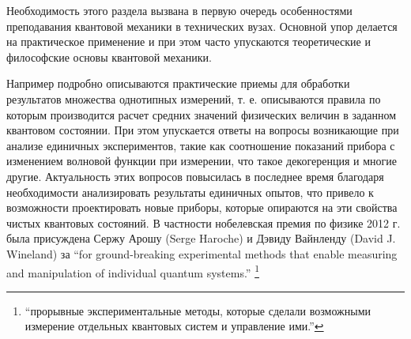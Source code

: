 Необходимость этого раздела вызвана в первую очередь особенностями
преподавания квантовой механики в технических вузах. Основной упор
делается на практическое применение и при этом часто упускаются
теоретические и философские основы квантовой механики.

Например подробно описываются практические приемы для обработки
результатов множества однотипных измерений, т. е. описываются правила
по которым производится расчет средних значений физических величин в
заданном квантовом состоянии. При этом упускается ответы на вопросы
возникающие при анализе единичных экспериментов, такие как соотношение
показаний прибора с изменением волновой функции при измерении, что
такое декогеренция 
и многие другие. Актуальность этих вопросов
повысилась в последнее время благодаря необходимости анализировать
результаты единичных опытов, что привело к возможности
проектировать новые приборы, которые опираются на эти свойства чистых
квантовых состояний. В частности нобелевская премия по физике 2012
г. была присуждена  Сержу Арошу (Serge Haroche) и
Дэвиду Вайнленду (David J. Wineland) за ``for ground-breaking experimental methods that enable measuring and manipulation of individual quantum systems.''
\footnote{
``прорывные
экспериментальные методы, которые сделали возможными измерение
отдельных квантовых систем и управление ими.''}
